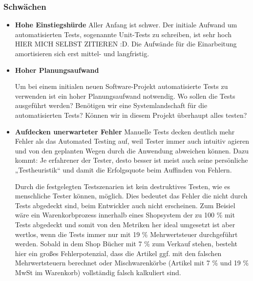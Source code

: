 \subsubsection{Schwächen}
\begin{itemize}	
	\item \textbf{Hohe Einstiegshürde}
	Aller Anfang ist schwer. Der initiale Aufwand um automatisierten Tests, sogenannte Unit-Tests zu schreiben, ist sehr hoch HIER MICH SELBST ZITIEREN :D. Die Aufwände für die Einarbeitung amortisieren sich erst mittel- und langfristig.
	
	\item \textbf{Hoher Planungsaufwand}
	
	Um bei einem initialen neuen Software-Projekt automatisierte Tests zu verwenden ist ein hoher Planungsaufwand notwendig. Wo sollen die Tests ausgeführt werden? Benötigen wir eine Systemlandschaft für die automatisierten Tests? Können wir in diesem Projekt überhaupt alles testen?
	
	\item \textbf{Aufdecken unerwarteter Fehler}
	Manuelle Tests decken deutlich mehr Fehler als das Automated Testing auf, weil Tester immer auch intuitiv agieren und von den geplanten Wegen durch die Anwendung abweichen können. Dazu kommt: Je erfahrener der Tester, desto besser ist meist auch seine persönliche „Testheuristik“ und damit die Erfolgsquote beim Auffinden von Fehlern.
	
	Durch die festgelegten Testszenarien ist kein destruktives Testen, wie es menschliche Tester können, möglich. Dies bedeutet das Fehler die nicht durch Tests abgedeckt sind, beim Entwickler auch nicht erscheinen. Zum Beisiel wäre ein Warenkorbprozess innerhalb eines Shopsystem der zu 100 \% mit Tests abgedeckt und somit von den Metriken her ideal umgesetzt ist aber wertlos, wenn die Tests immer nur mit 19 \% Mehrwertsteuer durchgeführt werden. Sobald in dem Shop Bücher mit 7 \% zum Verkauf stehen, besteht hier ein großes Fehlerpotenzial, dass die Artikel ggf. mit den falschen Mehrwertsteuern berechnet oder Mischwarenkörbe (Artikel mit 7 \% und 19 \% MwSt im Warenkorb) vollständig falsch kalkuliert sind. 
	
\end{itemize}
